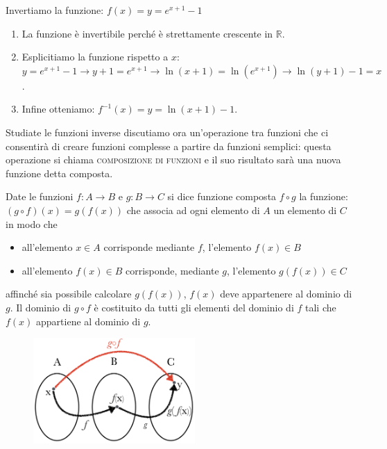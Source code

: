 \begin{esempio}
Invertiamo la funzione: $f(x)=y=e^{x+1}-1$
\begin{enumerate}
  \item La funzione è invertibile perché è strettamente crescente in 
$\mathbb{R}$.
  \item Esplicitiamo la funzione rispetto a $x$:\\
   $y=e^{x+1}-1\rightarrow y+1=e^{x+1}\rightarrow 
\ln(x+1)=\ln(e^{x+1})\rightarrow \ln(y+1)-1=x$.\item Infine otteniamo: 
$f^{-1}(x)=y=\ln(x+1)-1$.
\end{enumerate}
\end{esempio}

Studiate le funzioni inverse discutiamo ora un'operazione tra funzioni che ci 
consentirà di creare funzioni complesse a partire da funzioni semplici: 
questa operazione si chiama \textsc{composizione di funzioni} e il suo 
risultato sarà una nuova funzione detta composta.\\

%
\begin{definizione} 
Date le funzioni $f : A\to B$ e $g : B\to C$ si dice funzione composta 
$f\circ g$ la funzione:   $(g\circ f)(x)=g(f(x))$ che associa ad ogni 
elemento di $A$ un elemento di $C$ in modo che
  \begin{itemize}
  \item all'elemento $x\in A$ corrisponde mediante $f$, 
l'elemento $f(x)\in B$
  \item all'elemento $f(x)\in B$ corrisponde, mediante $g$, 
l'elemento $g(f(x))\in C$
  \end{itemize}
affinché sia possibile calcolare $g(f(x))$, $f(x)$ deve appartenere al 
dominio di $g$. Il dominio di $g\circ f$ è costituito da tutti gli elementi 
del dominio di $f$ tali che $f(x)$ appartiene al dominio di $g$.
\end{definizione}

\begin{figure}[htpb!]
  \centering
  \includegraphics[width=0.55\textwidth]{img/funz_15.png} 
\end{figure}
%

